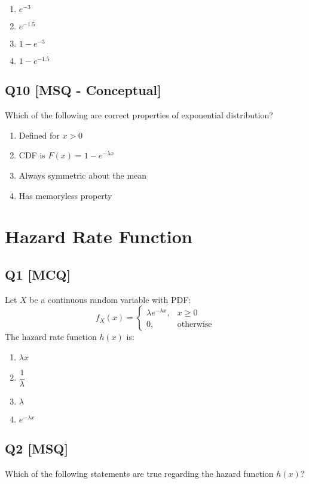 \begin{enumerate}[label=(\alph*)]
\item $e^{-3}$
\item $e^{-1.5}$
\item $1 - e^{-3}$
\item $1 - e^{-1.5}$
\end{enumerate}

\subsection*{Q10 [MSQ - Conceptual]}
Which of the following are correct properties of exponential distribution?

\begin{enumerate}[label=(\alph*)]
\item Defined for $x > 0$
\item CDF is $F(x) = 1 - e^{-\lambda x}$
\item Always symmetric about the mean
\item Has memoryless property
\end{enumerate}


\section{Hazard Rate Function}

\subsection*{Q1 [MCQ]}
Let $X$ be a continuous random variable with PDF:
\[ f_X(x) = \begin{cases}
\lambda e^{-\lambda x}, & x \geq 0 \\
0, & \text{otherwise}
\end{cases} \]
The hazard rate function $h(x)$ is:

\begin{enumerate}[label=(\alph*)]
\item $\lambda x$
\item $\dfrac{1}{\lambda}$
\item $\lambda$
\item $e^{-\lambda x}$
\end{enumerate}

\subsection*{Q2 [MSQ]}
Which of the following statements are true regarding the hazard function $h(x)$?


